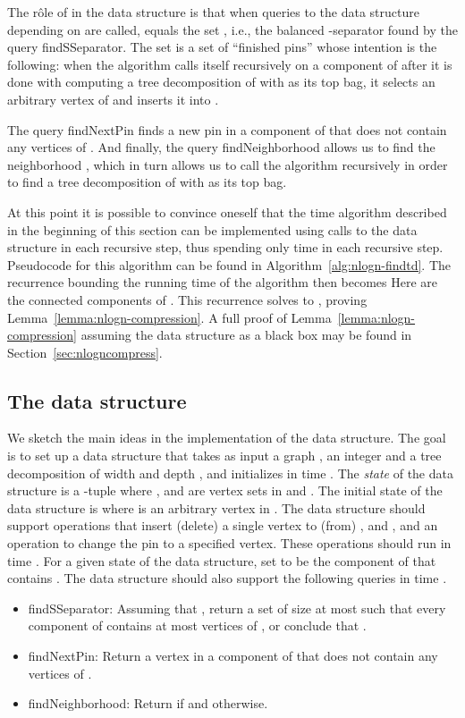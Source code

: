 \documentclass[a4paper,11pt]{article}
\theoremstyle{definition}
\theoremstyle{remark}
\newcommand{\qnei}{\textnormal{findNeighborhood}}
\newcommand{\qSsep}{\textnormal{findSSeparator}}
\newcommand{\qpin}{\textnormal{findNextPin}}
\begin{document}
The rôle of  in the data structure is that when queries to the data
structure depending on  are called,  equals the set ,
i.e., the balanced -separator found by the query \qSsep{}.  The set
 is a set of ``finished pins'' whose intention is the following:
when the algorithm calls itself recursively on a component  of
 after it is done with
computing a tree decomposition of  with  as
its top bag, it selects an arbitrary vertex of  and inserts it
into .  

The query \qpin{} finds a new pin  in a component  of  that does not contain any vertices
of .  And finally, the query \qnei{} allows us to find the
neighborhood , which in turn allows us to call the algorithm
recursively in order to find a tree decomposition of 
with  as its top bag.

At this point it is possible to convince oneself that the 
time algorithm described in the beginning of this section can be
implemented using  calls to the data structure in each
recursive step, thus spending only  time in each
recursive step.  Pseudocode for this algorithm can be found in
Algorithm~\ref{alg:nlogn-findtd}.  The recurrence bounding the running
time of the algorithm then becomes
 Here  are the connected
components of .  This
recurrence solves to , proving
Lemma~\ref{lemma:nlogn-compression}.  A full proof of
Lemma~\ref{lemma:nlogn-compression} assuming the data structure as a
black box may be found in Section~\ref{sec:nlogncompress}.

\subsection{The data structure}
\label{sec:dsoutline}
We sketch the main ideas in the implementation of the data structure.
The goal is to set up a data structure that takes as input a graph
, an integer  and a tree decomposition  of width
 and depth , and initializes in time .  The
{\em state} of the data structure is a -tuple  where
,  and  are vertex sets in  and .  The initial state of the data structure is
 where  is an arbitrary vertex in
.  The data structure should support operations that
insert (delete) a single vertex to (from) ,  and , and an
operation to change the pin  to a specified vertex.  These
operations should run in time .  For a given state of
the data structure, set  to be the component of 
that contains .  The data structure should also support the
following queries in time .
\begin{itemize}\setlength\itemsep{-.7mm}
\item \qSsep{}: Assuming that , return a set  of
  size at most  such that every component of  contains at most  vertices of
  , or conclude that .
\item \qpin{}: Return a vertex  in a component  of  that does not contain any vertices of .
\item \qnei{}: Return  if  and  otherwise.
\end{itemize}
\end{document}

